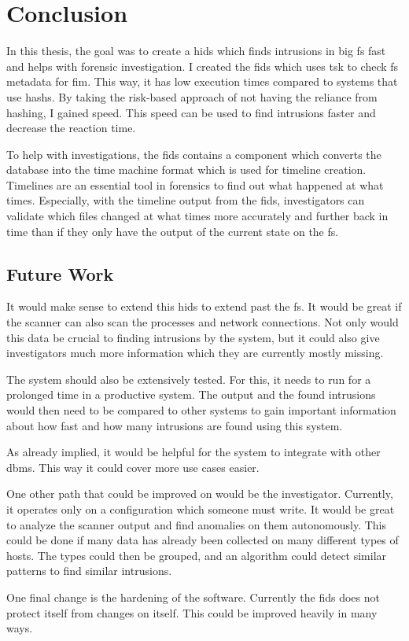 
\chapter{Conclusion}
\label{sec:Conclusion}
In this thesis, the goal was to create a \gls{hids} which finds \glspl{intrusion} in big \gls{fs} fast and helps with forensic investigation. I created the \gls{fids} which uses \gls{tsk} to check \gls{fs} \gls{metadata} for \gls{fim}. This way, it has low execution times compared to systems that use \glspl{hash}. By taking the risk-based approach of not having the reliance from hashing, I gained speed. This speed can be used to find \glspl{intrusion} faster and decrease the reaction time. 

To help with investigations, the \gls{fids} contains a component which converts the database into the time machine format which is used for timeline creation. Timelines are an essential tool in forensics to find out what happened at what times. Especially, with the timeline output from the \gls{fids}, investigators can validate which files changed at what times more accurately and further back in time than if they only have the output of the current state on the \gls{fs}. 

\section{Future Work}
\label{sec:future:work}


It would make sense to extend this \gls{hids} to extend past the \gls{fs}. It would be great if the scanner can also scan the processes and network connections. Not only would this data be crucial to finding \glspl{intrusion} by the system, but it could also give investigators much more information which they are currently mostly missing.

The system should also be extensively tested. For this, it needs to run for a prolonged time in a productive system. The output and the found \glspl{intrusion} would then need to be compared to other systems to gain important information about how fast and how many \glspl{intrusion} are found using this system. 

As already implied, it would be helpful for the system to integrate with other \gls{dbms}. This way it could cover more use cases easier. 

One other path that could be improved on would be the investigator. Currently, it operates only on a configuration which someone must write. It would be great to analyze the scanner output and find anomalies on them autonomously. This could be done if many data has already been collected on many different types of hosts. The types could then be grouped, and an algorithm could detect similar patterns to find similar \glspl{intrusion}. 

One final change is the hardening of the software. Currently the \gls{fids} does not protect itself from changes on itself. This could be improved heavily in many ways. 